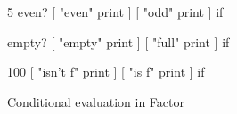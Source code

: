 \centering

  \begin{factorcode}
    5 even? [ "even" print ] [ "odd" print ] if

    { } empty? [ "empty" print ] [ "full" print ] if

    100 [ "isn't f" print ] [ "is f" print ] if
  \end{factorcode}

\caption{Conditional evaluation in Factor}
